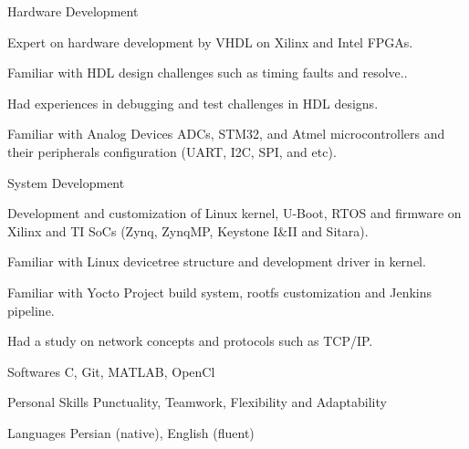


\begin{cvskills}


\cvskill
{Hardware Development} %
{
\item Expert on hardware development by VHDL on Xilinx and Intel FPGAs.
\item Familiar with HDL design challenges such as timing faults and resolve..
\item Had experiences in debugging and test challenges in HDL designs.
\item Familiar with Analog Devices ADCs, STM32, and Atmel microcontrollers and their peripherals configuration (UART, I2C, SPI, and etc).
}


\cvskill
{System Development} %
{
\item Development and customization of Linux kernel, U-Boot, RTOS and firmware on Xilinx and TI SoCs (Zynq, ZynqMP, Keystone I\&II and Sitara).
\item Familiar with Linux devicetree structure and development driver in kernel.
\item Familiar with Yocto Project build system, rootfs customization and Jenkins pipeline.
\item Had a study on network concepts and protocols such as TCP/IP.
}


\cvskill
{Softwares} %
{C, Git, MATLAB, OpenCl}


\cvskill
{Personal Skills} %
{Punctuality, Teamwork, Flexibility and Adaptability} %


\cvskill
{Languages} %
{Persian (native), English (fluent)} %


\end{cvskills}
